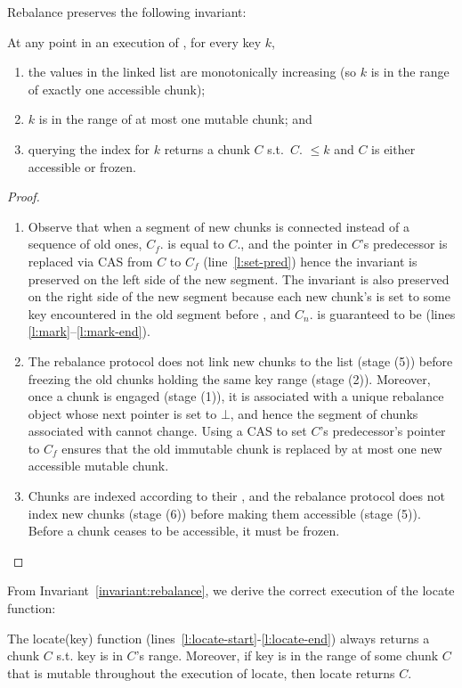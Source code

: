 Rebalance preserves the following invariant:
\begin{invariant}
At any point in an execution of \kiwi, for every key $k$,  
\begin{enumerate}
\item the  values in the linked list are monotonically increasing (so $k$ is in the range of exactly one accessible chunk);  
\item  $k$ is in the range of at most one mutable chunk; and 
\item querying the index for $k$  returns a chunk $C$ s.t.\  $C$. $\le k$ and $C$ is either accessible or frozen.
\end{enumerate}
\label{invariant:rebalance}
\end{invariant}
\begin{proof}
\begin{enumerate}
\item
Observe that when a segment of new chunks is connected instead of a sequence of old ones, $C_f$. is equal to $C$., 
and  the  pointer in $C$'s predecessor is replaced via CAS from $C$ to $C_f$ (line~\ref{l:set-pred}) hence the invariant is preserved on the left side of the new segment.
The invariant is also preserved on the right side of the new segment because each new chunk's  is set to some key encountered in the old segment before , 
and $C_n$. is guaranteed to be  (lines  \ref{l:mark}--\ref{l:mark-end}).  
\item
The rebalance protocol does not link new chunks to the list (stage (5)) 
before freezing the old chunks holding the same key range (stage (2)).
Moreover, once a chunk is engaged (stage (1)), it is associated with a unique rebalance object 
whose next pointer is set to $\bot$, 
and hence the segment of chunks associated with  cannot change. 
Using a CAS to set $C$'s predecessor's  pointer to $C_f$ ensures 
that the old immutable chunk is replaced by at most one new accessible mutable chunk.
\item
Chunks are indexed according to their , and 
the rebalance protocol does not index new chunks (stage (6)) before making them accessible (stage (5)). 
Before a chunk ceases to be accessible, it must be frozen. 
\end{enumerate}
\end{proof}

From Invariant~\ref{invariant:rebalance}, we derive the correct execution of the locate function:
\begin{corollary}
The locate(key) function  (lines~\ref{l:locate-start}-\ref{l:locate-end}) always returns a chunk $C$ s.t. key is in $C$'s range.
Moreover, if key is in the range of some chunk $C$ that is mutable throughout the execution of locate, then locate returns $C$.
\end{corollary}


